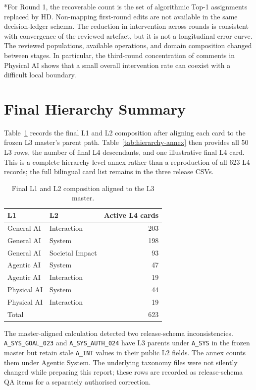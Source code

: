 \documentclass[10pt,a4paper]{article}
\begin{document}
*For Round 1, the recoverable count is the set of algorithmic Top-1 assignments replaced by HD. Non-mapping first-round edits are not available in the same decision-ledger schema. The reduction in intervention across rounds is consistent with convergence of the reviewed artefact, but it is not a longitudinal error curve. The reviewed populations, available operations, and domain composition changed between stages. In particular, the third-round concentration of comments in Physical AI shows that a small overall intervention rate can coexist with a difficult local boundary.

\section{Final Hierarchy Summary}

Table~\ref{tab:final-l2} records the final L1 and L2 composition after aligning each card to the frozen L3 master's parent path. Table~\ref{tab:hierarchy-annex} then provides all 50 L3 rows, the number of final L4 descendants, and one illustrative final L4 card. This is a complete hierarchy-level annex rather than a reproduction of all 623 L4 records; the full bilingual card list remains in the three release CSVs.

\begin{table}[H]
\centering
\caption{Final L1 and L2 composition aligned to the L3 master.}
\label{tab:final-l2}
\begin{tabular}{llr}
\toprule
L1 & L2 & Active L4 cards \\
\midrule
General AI & Interaction & 203 \\
General AI & System & 198 \\
General AI & Societal Impact & 93 \\
Agentic AI & System & 47 \\
Agentic AI & Interaction & 19 \\
Physical AI & System & 44 \\
Physical AI & Interaction & 19 \\
\midrule
Total & & 623 \\
\bottomrule
\end{tabular}
\end{table}

The master-aligned calculation detected two release-schema inconsistencies. \nolinkurl{A_SYS_GOAL_023} and \nolinkurl{A_SYS_AUTH_024} have L3 parents under \nolinkurl{A_SYS} in the frozen master but retain stale \nolinkurl{A_INT} values in their public L2 fields. The annex counts them under Agentic System. The underlying taxonomy files were not silently changed while preparing this report; these rows are recorded as release-schema QA items for a separately authorised correction.

{\footnotesize

}

\begingroup
\small


\endgroup
\end{document}
